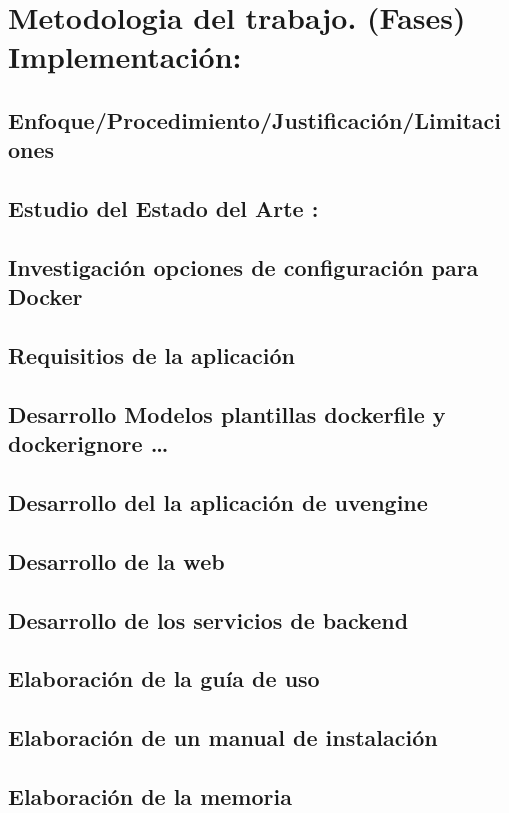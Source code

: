\documentclass[12pt, a4paper, twoside]{article}
\begin{document}
\section{Metodologia del trabajo. (Fases) Implementación:}
\subsection{Enfoque/Procedimiento/Justificación/Limitaciones}
\subsection{Estudio del Estado del Arte :}
\subsection{Investigación opciones de configuración para Docker}
\subsection{Requisitios de la aplicación }
\subsection{Desarrollo Modelos plantillas dockerfile y dockerignore …}
\subsection{Desarrollo del la aplicación de uvengine }
\subsection{Desarrollo de la web}
\subsection{Desarrollo de los servicios de backend}
\subsection{Elaboración de la guía de uso}
\subsection{Elaboración de un manual de instalación}
\subsection{Elaboración de la memoria}


\end{document}
